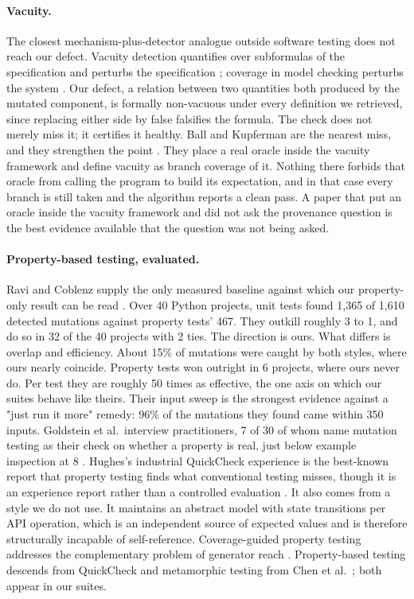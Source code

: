 \documentclass[12pt]{article}
\begin{document}
\paragraph{Vacuity.} The closest mechanism-plus-detector analogue outside
software testing does not reach our defect. Vacuity detection quantifies over
subformulas of the specification and perturbs the specification
\cite{beer2001,armoni2003,kupferman2006,gheorghiu2006}; coverage in model
checking perturbs the system \cite{chockler2006fmsd,katz1999}. Our defect, a
relation between two quantities both produced by the mutated component, is
formally non-vacuous under every definition we retrieved, since replacing either
side by false falsifies the formula. The check does not merely miss it; it
certifies it healthy. Ball and Kupferman are the nearest miss, and they strengthen the
point \cite{ball2008}. They place a real oracle inside the vacuity framework and
define vacuity as branch coverage of it. Nothing there forbids that oracle from
calling the program to build its expectation, and in that case every branch is
still taken and the algorithm reports a clean pass. A paper that put an oracle inside the
vacuity framework and did not ask the provenance question is the best evidence
available that the question was not being asked.

\paragraph{Property-based testing, evaluated.} Ravi and Coblenz supply the only measured
baseline against which our property-only result can be read
\cite{ravi2025}. Over 40 Python projects, unit tests found 1{,}365 of 1{,}610
detected mutations against property tests' 467. They outkill roughly 3 to 1, and
do so in 32 of the 40 projects with 2 ties. The direction is ours. What differs is
overlap and efficiency. About 15\% of mutations were caught by both styles,
where ours nearly coincide. Property tests won outright in 6 projects, where ours
never do. Per test they are roughly 50 times as effective, the one axis on which
our suites behave like theirs. Their input sweep is the strongest
evidence against a "just run it more" remedy: 96\% of the mutations they
found came within 350 inputs. Goldstein et al.\
interview practitioners, 7 of 30 of whom name mutation testing as their check on
whether a property is real, just below example inspection at 8
\cite{goldstein2024}. Hughes's industrial
QuickCheck experience is the best-known report that property testing finds what
conventional testing misses, though it is an experience report rather than a
controlled evaluation \cite{hughes}. It also comes from a style we do not use. It
maintains an abstract model with state transitions per API operation, which is an
independent source of expected values and is therefore structurally incapable of
self-reference. Coverage-guided property testing
addresses the complementary problem of generator reach \cite{lampropoulos2019}.
Property-based testing descends from QuickCheck \cite{claessen2000} and
metamorphic testing from Chen et al.\ \cite{chen1998,segura2016}; both
appear in our suites.
\end{document}
